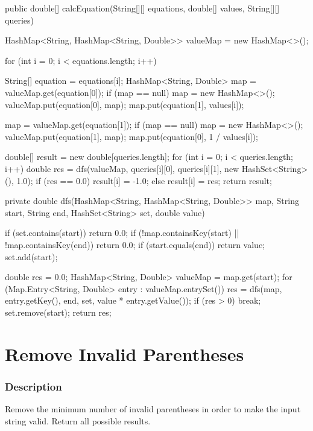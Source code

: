 \begin{Code}
public double[] calcEquation(String[][] equations, double[] values, String[][] queries) {
    HashMap<String, HashMap<String, Double>> valueMap = new HashMap<>();

    for (int i = 0; i < equations.length; i++) {
        String[] equation = equations[i];
        HashMap<String, Double> map = valueMap.get(equation[0]);
        if (map == null) {
            map = new HashMap<>();
            valueMap.put(equation[0], map);
        }
        map.put(equation[1], values[i]);

        map = valueMap.get(equation[1]);
        if (map == null) {
            map = new HashMap<>();
            valueMap.put(equation[1], map);
        }
        map.put(equation[0], 1 / values[i]);
    }

    double[] result = new double[queries.length];
    for (int i = 0; i < queries.length; i++) {
        double res = dfs(valueMap, queries[i][0], queries[i][1], new HashSet<String>(), 1.0);
        if (res == 0.0) {
            result[i] = -1.0;
        } else {
            result[i] = res;
        }
    }
    return result;
}

private double dfs(HashMap<String, HashMap<String, Double>> map, String start, String end, HashSet<String> set, double value) {
    if (set.contains(start)) {
        return 0.0;
    }
    if (!map.containsKey(start) || !map.containsKey(end)) {
        return 0.0;
    }
    if (start.equals(end)) {
        return value;
    }
    set.add(start);

    double res = 0.0;
    HashMap<String, Double> valueMap = map.get(start);
    for (Map.Entry<String, Double> entry : valueMap.entrySet()) {
        res = dfs(map, entry.getKey(), end, set, value * entry.getValue());
        if (res > 0) {
            break;
        }
    }
    set.remove(start);
    return res;
}
\end{Code}

\newpage

\section{Remove Invalid Parentheses} %

\subsubsection{Description}

Remove the minimum number of invalid parentheses in order to make the input string valid. Return all possible results.

